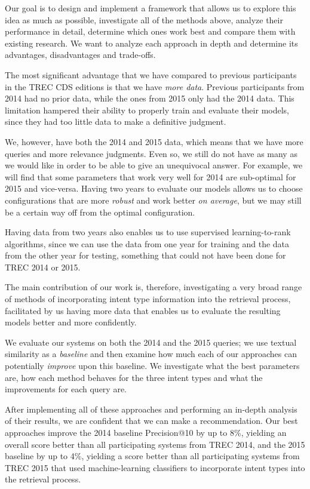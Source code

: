 Our goal is to design and implement a framework that allows us
to explore this idea as much as possible, investigate all of the methods above,
analyze their performance in detail,
determine which ones work best and compare them with existing research.
We want to analyze each approach in depth and determine its advantages, disadvantages and trade-offs.

The most significant advantage that we have compared to previous participants in the TREC CDS editions is
that we have \emph{more data}. Previous participants from 2014 had no prior data, while the ones from 2015
only had the 2014 data. This limitation hampered their ability to properly train and evaluate their models, since they
had too little data to make a definitive judgment.

We, however, have both the 2014 and 2015 data, which means that
we have more queries and more relevance judgments.
Even so, we still do not have as many as we would like in order to be able to give an unequivocal answer.
For example, we will find
that some parameters that work very well for 2014 are sub-optimal for 2015 and vice-versa.
Having two
years to evaluate our models allows us to choose configurations that are more \emph{robust} and work better \emph{on average}, but we
may still be a certain way off from the optimal configuration.

Having data from two years also
enables us to use supervised learning-to-rank algorithms,
since we can use the data from one year for training and the data from the other year for testing,
something that could not have been done for TREC 2014 or 2015.

The main contribution of our work is, therefore, investigating a very broad range of methods of incorporating
intent type information into the retrieval process,
facilitated by us having more data that enables us to evaluate the resulting models better and more confidently.

We evaluate our systems on both the 2014 and the 2015 queries; we use textual similarity
as a \emph{baseline} and then examine how much each of our approaches can potentially \emph{improve} upon this baseline.
We investigate what the best parameters are, how each method behaves for the three
intent types and what the improvements for each query are.

After implementing all of these approaches and performing an in-depth analysis of their results,
we are confident that we can make a recommendation.
Our best approaches improve the 2014 baseline Precision@10 by up to 8\%, yielding an overall
score better than all participating systems from TREC 2014,
and the 2015 baseline by up to 4\%, yielding a score better than all participating
systems from TREC 2015 that used machine-learning classifiers to incorporate intent
types into the retrieval process.

